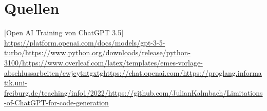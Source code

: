 \documentclass[class=scrbook, crop=false]{standalone}
\begin{document}
\chapter*{Quellen}
\label{ch:quellen}
{

[Open AI Training von ChatGPT 3.5] \url{https://platform.openai.com/docs/models/gpt-3-5-turbo/} \url{https://www.python.org/downloads/release/python-3100/} \url{https://www.overleaf.com/latex/templates/emes-vorlage-abschlussarbeiten/cwjcytntgxtg} \url{https://chat.openai.com/} \url{https://proglang.informatik.uni-freiburg.de/teaching/info1/2022/} \url{https://github.com/JulianKalmbach/Limitations-of-ChatGPT-for-code-generation}\newline
}
\end{document}
